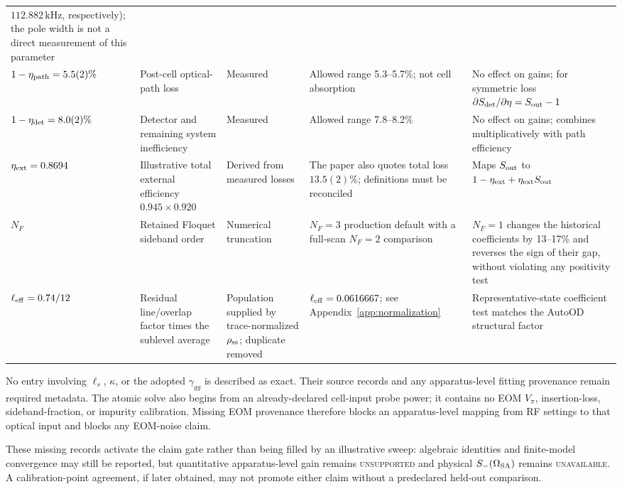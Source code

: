 \documentclass[11pt,a4paper]{article}
\newcommand{\kHz}{\,\mathrm{kHz}}
\begin{document}
\begin{longtable}{L{2.8cm}L{3.4cm}L{2.5cm}L{3.4cm}L{3.4cm}}
$112.882\kHz$, respectively);
the pole width is not a direct measurement of this parameter\\
$1-\eta_{\rm path}=5.5(2)\%$ &
Post-cell optical-path loss &
Measured \cite{Sim2025} &
Allowed range 5.3--5.7\%; not cell absorption &
No effect on gains; for symmetric loss
$\partial S_{\rm det}/\partial\eta=S_{\rm out}-1$\\
$1-\eta_{\rm det}=8.0(2)\%$ &
Detector and remaining system inefficiency &
Measured \cite{Sim2025} &
Allowed range 7.8--8.2\% &
No effect on gains; combines multiplicatively with path efficiency\\
$\eta_{\rm ext}=0.8694$ &
Illustrative total external efficiency
$0.945\times0.920$ &
Derived from measured losses &
The paper also quotes total loss $13.5(2)\%$; definitions must be reconciled &
Maps $S_{\rm out}$ to $1-\eta_{\rm ext}+\eta_{\rm ext}S_{\rm out}$\\
$N_F$ &
Retained Floquet sideband order &
Numerical truncation &
$N_F=3$ production default with a full-scan $N_F=2$ comparison &
$N_F=1$ changes the historical coefficients by 13--17\% and reverses the sign
of their gap, without
violating any positivity test\\
$\ell_{\rm eff}=0.74/12$ &
Residual line/overlap factor times the sublevel average &
Population supplied by trace-normalized $\rho_{\rm ss}$; duplicate removed &
$\ell_{\rm eff}=0.0616667$; see Appendix~\ref{app:normalization} &
Representative-state coefficient test matches the AutoOD structural factor\\
\end{longtable}
\endgroup

No entry involving $\ell_s$, $\kappa$, or the adopted $\gamma_{gg}$ is
described as exact. Their source records and any apparatus-level fitting
provenance remain required metadata.
The atomic solve also begins from an already-declared cell-input probe power;
it contains no EOM $V_\pi$, insertion-loss, sideband-fraction, or impurity
calibration. Missing EOM provenance therefore blocks an apparatus-level mapping
from RF settings to that optical input and blocks any EOM-noise claim.

These missing records activate the claim gate rather than being filled by an
illustrative sweep: algebraic identities and finite-model convergence may still
be reported, but quantitative apparatus-level gain remains
\textsc{unsupported} and physical $S_-(\Omega_{\rm SA})$ remains
\textsc{unavailable}. A calibration-point agreement, if later obtained, may not
promote either claim without a predeclared held-out comparison.
\end{document}
